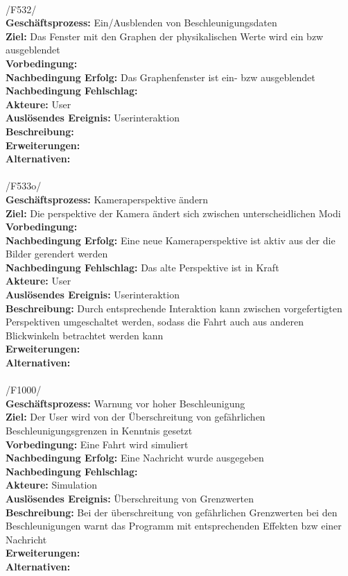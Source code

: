 \\
/F532/\\
\textbf{Geschäftsprozess:}  Ein/Ausblenden von Beschleunigungsdaten\\
\textbf{Ziel:}  Das Fenster mit den Graphen der physikalischen Werte wird ein bzw ausgeblendet\\
\textbf{Vorbedingung:} \\
\textbf{Nachbedingung Erfolg:} Das Graphenfenster ist ein- bzw ausgeblendet\\
\textbf{Nachbedingung Fehlschlag:}\\ 
\textbf{Akteure:} User\\
\textbf{Auslösendes Ereignis:} Userinteraktion\\
\textbf{Beschreibung:} \\
\textbf{Erweiterungen:}\\
\textbf{Alternativen:}\\
\\
/F533o/\\
\textbf{Geschäftsprozess:}  Kameraperspektive ändern\\
\textbf{Ziel:}  Die perspektive der Kamera ändert sich zwischen unterscheidlichen Modi\\
\textbf{Vorbedingung:} \\
\textbf{Nachbedingung Erfolg:} Eine neue Kameraperspektive ist aktiv aus der die Bilder gerendert werden\\
\textbf{Nachbedingung Fehlschlag:} Das alte Perspektive ist in Kraft\\
\textbf{Akteure:} User\\
\textbf{Auslösendes Ereignis:} Userinteraktion\\
\textbf{Beschreibung:} Durch entsprechende Interaktion kann zwischen vorgefertigten Perspektiven umgeschaltet werden, sodass die Fahrt auch aus anderen Blickwinkeln betrachtet werden kann\\
\textbf{Erweiterungen:}\\
\textbf{Alternativen:}\\
\\
/F1000/\\
\textbf{Geschäftsprozess:} Warnung vor hoher Beschleunigung\\
\textbf{Ziel:} Der User wird von der Überschreitung von gefährlichen Beschleunigungsgrenzen in Kenntnis gesetzt\\
\textbf{Vorbedingung:} Eine Fahrt wird simuliert\\
\textbf{Nachbedingung Erfolg:} Eine Nachricht wurde ausgegeben\\
\textbf{Nachbedingung Fehlschlag:} \\
\textbf{Akteure:} Simulation\\
\textbf{Auslösendes Ereignis:} Überschreitung von Grenzwerten\\
\textbf{Beschreibung:} Bei der überschreitung von gefährlichen Grenzwerten bei den Beschleunigungen warnt das Programm mit entsprechenden Effekten bzw einer Nachricht\\
\textbf{Erweiterungen:}\\
\textbf{Alternativen:}\\
